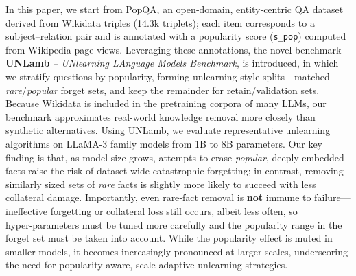 \documentclass[11pt]{article}
\begin{document}
In this paper, we start from PopQA, an open‑domain, entity‑centric QA dataset derived from Wikidata triples (14.3k triplets); each item corresponds to a subject–relation pair and is annotated with a popularity score (\texttt{s\_pop}) computed from Wikipedia page views.  
Leveraging these annotations, the novel benchmark \textbf{UNLamb} \textit{-- UNlearning LAnguage Models Benchmark}, is introduced, in which we stratify questions by popularity, forming unlearning-style splits—matched \emph{rare}/\emph{popular} forget sets, and keep the remainder for retain/validation sets. 
Because Wikidata is included in the pretraining corpora of many LLMs, our benchmark approximates real-world knowledge removal more closely than synthetic alternatives. Using UNLamb, we evaluate representative unlearning algorithms on LLaMA-3 family models from 1B to 8B parameters.  
Our key finding is that, as model size grows, attempts to erase \emph{popular}, deeply embedded facts raise the risk of dataset‑wide catastrophic forgetting; in contrast, removing similarly sized sets of \emph{rare} facts is slightly more likely to succeed with less collateral damage.  
Importantly, even rare‑fact removal is \textbf{not} immune to failure—ineffective forgetting or collateral loss still occurs, albeit less often, so hyper‑parameters must be tuned more carefully and the popularity range in the forget set must be taken into account.  
While the popularity effect is muted in smaller models, it becomes increasingly pronounced at larger scales, underscoring the need for popularity‑aware, scale‑adaptive unlearning strategies.
\end{document}

